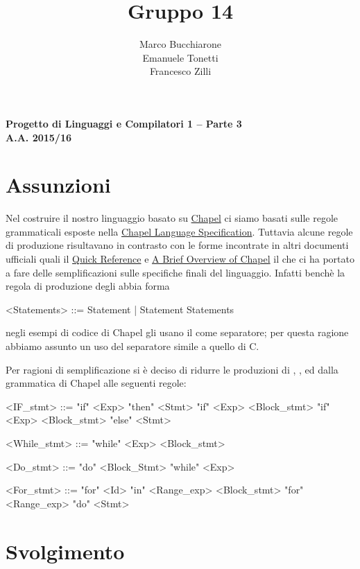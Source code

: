 \documentclass[a4paper,oneside,11pt]{article}
\makeatletter
\renewcommand\and{\\}
\renewcommand\maketitle{%
\bigskip\bigskip\bigskip\bigskip%
\begin{center}\bfseries\large%
Progetto di Linguaggi e Compilatori 1 -- Parte 3 \\ A.A. 2015/16\\%
\end{center}%
\bigskip%
\begin{center}\bfseries\LARGE \@title  \end{center}%
\bigskip%
\begin{center}\bfseries\large \@author \end{center}%
\bigskip\bigskip}
\makeatother
\begin{document}
\title{Gruppo 14}
\author{Marco Bucchiarone \and Emanuele Tonetti \and Francesco Zilli}
\maketitle
%
\section*{Assunzioni}
Nel costruire il nostro linguaggio basato su \href{http://chapel.cray.com}{Chapel} ci siamo basati sulle regole grammaticali esposte nella \href{http://chapel.cray.com/docs/latest/_downloads/chapelLanguageSpec.pdf}{Chapel Language Specification}.
Tuttavia alcune regole di produzione risultavano in contrasto con le forme incontrate in altri documenti ufficiali quali il \href{http://chapel.cray.com/docs/latest/_downloads/quickReference.pdf}{Quick Reference} e \href{http://chapel.cray.com/papers/BriefOverviewChapel.pdf}{A Brief Overview of Chapel} il che ci ha portato a fare delle semplificazioni sulle specifiche finali del linguaggio.
Infatti benchè la regola di produzione degli  abbia forma
\begin{grammar}
	   <Statements> ::= Statement | Statement Statements
\end{grammar}
negli esempi di codice di Chapel gli  usano il \lit{;} come separatore; per questa ragione abbiamo assunto un uso del separatore \lit{;} simile a quello di C. 
\par
Per ragioni di semplificazione si è deciso di ridurre le produzioni di , ,  ed  dalla grammatica di Chapel alle seguenti regole:
\begin{grammar}
<IF_stmt> ::= "if" <Exp> "then" <Stmt>
	\alt "if" <Exp>  <Block_stmt>
	\alt "if" <Exp>  <Block_stmt> "else" <Stmt>

<While_stmt> ::= "while" <Exp> <Block_stmt>

<Do_stmt> ::= "do" <Block_Stmt> "while" <Exp>

<For_stmt> ::= "for" <Id> "in" <Range_exp> <Block_stmt>
\alt "for" <Range_exp> "do" <Stmt>
\end{grammar}

\section*{Svolgimento}
\end{document}
